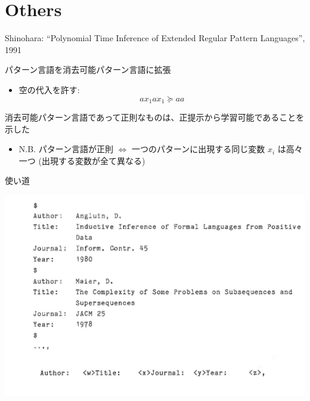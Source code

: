 \documentclass[professionalfont, 12pt, dvipdfmx, default, cjk]{beamer}
\begin{document}
\section{Others}\label{others}

\begin{frame}{Shinohara: ``Polynomial Time Inference of Extended Regular
Pattern Languages'', 1991}

パターン言語を消去可能パターン言語に拡張

\begin{itemize}
\itemsep1pt\parskip0pt
\item
  空の代入を許す: \[a x_1 a x_1 \succeq a a\]
\end{itemize}

消去可能パターン言語であって正則なものは、正提示から学習可能であることを示した

\begin{itemize}
\itemsep1pt\parskip0pt
\item
  N.B. パターン言語が正則 \(\iff\) 一つのパターンに出現する同じ変数
  \(x_i\) は高々一つ (出現する変数が全て異なる)
\end{itemize}

\end{frame}

\begin{frame}{使い道}

\includegraphics[width=1.0\textwidth,bb=0 0 1186 794]{img/shinohara.jpg}

\end{frame}
\end{document}
